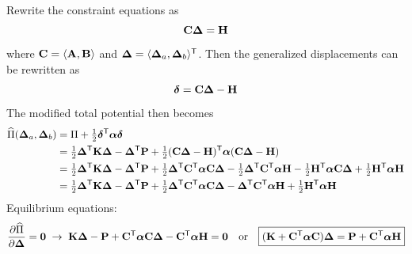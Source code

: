 Rewrite the constraint equations as
\begin{equation*}
  \mathbf{C}\bm{\Delta} = \mathbf{H}
\end{equation*}
where $\mathbf{C} = \langle\mathbf{A}, \mathbf{B}\rangle$ and $\bm{\Delta} = \langle\bm{\Delta}_a, \bm{\Delta}_b\rangle^{\mathsf{T}}$. Then the generalized displacements can be rewritten as
\begin{equation*}
  \bm{\delta} = \mathbf{C}\bm{\Delta} - \mathbf{H}
\end{equation*}
The modified total potential then becomes
\begin{equation*}
  \begin{aligned}
    \widehat\Pi(\bm{\Delta}_a, \bm{\Delta}_b) &= \Pi + \tfrac12\bm{\delta}^{\mathsf{T}}\bm{\alpha}\bm{\delta}\\
    &= \tfrac12\bm{\Delta}^{\mathsf{T}}\mathbf{K}\bm{\Delta} - \bm{\Delta}^{\mathsf{T}}\mathbf{P} + \tfrac12(\mathbf{C}\bm{\Delta} - \mathbf{H})^{\mathsf{T}}\bm{\alpha}(\mathbf{C}\bm{\Delta} - \mathbf{H})\\
    &= \tfrac12\bm{\Delta}^{\mathsf{T}}\mathbf{K}\bm{\Delta} - \bm{\Delta}^{\mathsf{T}}\mathbf{P} + \tfrac12\bm{\Delta}^{\mathsf{T}}\mathbf{C}^{\mathsf{T}}\bm{\alpha}\mathbf{C}\bm{\Delta} - \tfrac12\bm{\Delta}^{\mathsf{T}}\mathbf{C}^{\mathsf{T}}\bm{\alpha}\mathbf{H} - \tfrac12\mathbf{H}^{\mathsf{T}}\bm{\alpha}\mathbf{C}\bm{\Delta} + \tfrac12\mathbf{H}^{\mathsf{T}}\bm{\alpha}\mathbf{H}\\
    &= \tfrac12\bm{\Delta}^{\mathsf{T}}\mathbf{K}\bm{\Delta} - \bm{\Delta}^{\mathsf{T}}\mathbf{P} + \tfrac12\bm{\Delta}^{\mathsf{T}}\mathbf{C}^{\mathsf{T}}\bm{\alpha}\mathbf{C}\bm{\Delta} - \bm{\Delta}^{\mathsf{T}}\mathbf{C}^{\mathsf{T}}\bm{\alpha}\mathbf{H} + \tfrac12\mathbf{H}^{\mathsf{T}}\bm{\alpha}\mathbf{H}
  \end{aligned}
\end{equation*}
Equilibrium equations:
\begin{equation}
  \frac{\partial \widehat\Pi}{\partial \bm{\Delta}} = \mathbf{0}\;\rightarrow\;
  \mathbf{K}\bm{\Delta} - \mathbf{P} + \mathbf{C}^{\mathsf{T}}\bm{\alpha}\mathbf{C}\bm{\Delta} - \mathbf{C}^{\mathsf{T}}\bm{\alpha}\mathbf{H} = \mathbf{0}\quad\text{or}\quad
  \boxed{(\mathbf{K} + \mathbf{C}^{\mathsf{T}}\bm{\alpha}\mathbf{C})\bm{\Delta} = \mathbf{P} + \mathbf{C}^{\mathsf{T}}\bm{\alpha}\mathbf{H}}
\end{equation}

